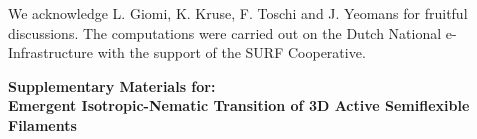 \documentclass[
reprint,
superscriptaddress,
prl,









 amsmath,amssymb,
 aps,






]{revtex4-2}
\begin{document}
\begin{acknowledgements}
We acknowledge  L. Giomi, K.  Kruse, F. Toschi and  J. Yeomans for fruitful discussions. The computations were carried out on the Dutch National e-Infrastructure with the support of the SURF Cooperative.
\end{acknowledgements}


\newpage

\makeatletter
\def\thesection{\Roman{section}}
\def\thesubsection{\Alph{subsection}}
\makeatother



\clearpage
\onecolumngrid

\begin{center}
    \textbf{\large Supplementary Materials for:\\ Emergent Isotropic-Nematic Transition of 3D Active Semiflexible Filaments}
\end{center}
\bigskip


\setcounter{figure}{0}
\setcounter{table}{0}
\setcounter{equation}{0}
\renewcommand{\thefigure}{S\arabic{figure}}
\renewcommand{\thetable}{S\arabic{table}}
\renewcommand{\theequation}{S\arabic{equation}}



\end{document}
